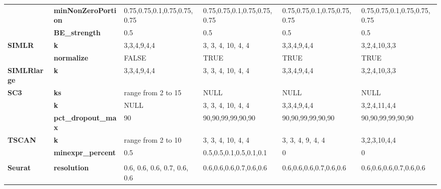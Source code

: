 \documentclass[12pt, a4paper]{article}\usepackage[]{graphicx}\usepackage[]{color}
\begin{document}
\begin{table}[htbp]
{\begin{tabular}{rp{5.585em}llll}
          & \textbf{minNonZeroPortion} & \multicolumn{1}{p{13.335em}}{0.75,0.75,0.1,0.75,0.75,0.75} & \multicolumn{1}{p{10.165em}}{0.75,0.75,0.1,0.75,0.75,0.75} & \multicolumn{1}{p{9.085em}}{0.75,0.75,0.1,0.75,0.75,0.75} & \multicolumn{1}{p{9.835em}}{0.75,0.75,0.1,0.75,0.75,0.75} \\
          & \textbf{BE\_strength} & 0.5   & 0.5   & 0.5   & 0.5 \\
    \midrule
    \multicolumn{1}{l}{\textbf{SIMLR}} & \textbf{k} & \multicolumn{1}{p{13.335em}}{3,3,4,9,4,4} & \multicolumn{1}{p{10.165em}}{3, 3, 4, 10, 4, 4} & \multicolumn{1}{p{9.085em}}{3,3,4,9,4,4} & \multicolumn{1}{p{9.835em}}{3,2,4,10,3,3} \\
          & \textbf{normalize} & \multicolumn{1}{p{13.335em}}{FALSE} & \multicolumn{1}{p{10.165em}}{TRUE} & \multicolumn{1}{p{9.085em}}{TRUE} & \multicolumn{1}{p{9.835em}}{TRUE} \\
    \midrule
    \multicolumn{1}{l}{\textbf{SIMLRlarge}} & \textbf{k} & \multicolumn{1}{p{13.335em}}{3,3,4,9,4,4} & \multicolumn{1}{p{10.165em}}{3, 3, 4, 10, 4, 4} & \multicolumn{1}{p{9.085em}}{3,3,4,9,4,4} & \multicolumn{1}{p{9.835em}}{3,2,4,10,3,3} \\
    \midrule
    \multicolumn{1}{l}{\textbf{SC3}} & \textbf{ks} & \multicolumn{1}{p{13.335em}}{range from 2 to 15} & \multicolumn{1}{p{10.165em}}{NULL} & \multicolumn{1}{p{9.085em}}{NULL} & \multicolumn{1}{p{9.835em}}{NULL} \\
          & \textbf{k} & \multicolumn{1}{p{13.335em}}{NULL} & \multicolumn{1}{p{10.165em}}{3, 3, 4, 10, 4, 4} & \multicolumn{1}{p{9.085em}}{3,3,4,9,4,4} & \multicolumn{1}{p{9.835em}}{3,2,4,11,4,4} \\
          & \textbf{pct\_dropout\_max} & 90    & \multicolumn{1}{p{10.165em}}{90,90,99,99,90,90} & \multicolumn{1}{p{9.085em}}{90,90,99,99,90,90} & \multicolumn{1}{p{9.835em}}{90,90,99,99,90,90} \\
    \midrule
    \multicolumn{1}{l}{\textbf{TSCAN}} & \textbf{k} & \multicolumn{1}{p{13.335em}}{range from 2 to 10} & \multicolumn{1}{p{10.165em}}{3, 3, 4, 10, 4, 4} & \multicolumn{1}{p{9.085em}}{3, 3, 4, 9, 4, 4} & \multicolumn{1}{p{9.835em}}{3,2,3,10,4,4} \\
          & \textbf{minexpr\_percent} & 0.5   & \multicolumn{1}{p{10.165em}}{0.5,0.5,0.1,0.5,0.1,0.1} & 0     & 0 \\
          & \multicolumn{1}{l}{} &       &       &       &  \\
    \midrule
    \multicolumn{1}{l}{\textbf{Seurat}} & \textbf{resolution} & \multicolumn{1}{p{13.335em}}{0.6, 0.6, 0.6, 0.7, 0.6, 0.6} & \multicolumn{1}{p{10.165em}}{0.6,0.6,0.6,0.7,0.6,0.6} & \multicolumn{1}{p{9.085em}}{0.6,0.6,0.6,0.7,0.6,0.6} & \multicolumn{1}{p{9.835em}}{0.6,0.6,0.6,0.7,0.6,0.6} \\

\end{tabular}}
\end{table}
\end{document}
